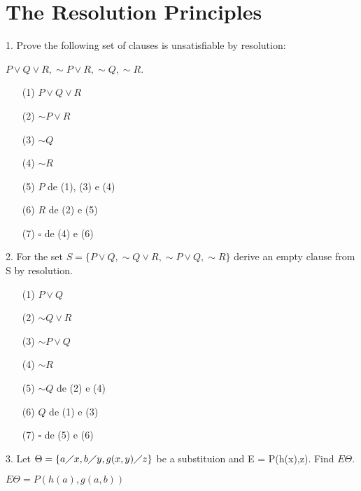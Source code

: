 \section{The Resolution Principles}

1. Prove the following set of clauses is unsatisfiable by resolution:

$ P \vee Q \vee R, \sim P \vee R, \sim Q, \sim R $.

\begin{itemize}
 \item[(1)] $ P \vee Q \vee R $
 \item[(2)] $ \sim P \vee R $
 \item[(3)] $ \sim Q $
 \item[(4)] $ \sim R $
 \item[(5)] $ P $ de (1), (3) e (4)
 \item[(6)] $ R $ de (2) e (5)
 \item[(7)] $ \square $ de (4) e (6)
\end{itemize}

2. For the set $ S = \{P\vee Q, \sim Q \vee R, \sim P \vee Q, \sim R\} $ derive an empty clause from S by resolution.

\begin{itemize}
 \item[(1)] $ P \vee Q $
 \item[(2)] $ \sim Q \vee R $
 \item[(3)] $ \sim P \vee Q $
 \item[(4)] $ \sim R $
 \item[(5)] $ \sim Q $ de (2) e (4)
 \item[(6)] $ Q $ de (1) e (3)
 \item[(7)] $ \square $ de (5) e (6)
\end{itemize}

3. Let $ \Theta = \{ a\diagup x, b\diagup y, g(x,y)\diagup z \} $ be a substituion and E = P(h(x),z). Find $E\Theta$.

$E\Theta = P(h(a), g(a,b)) $

